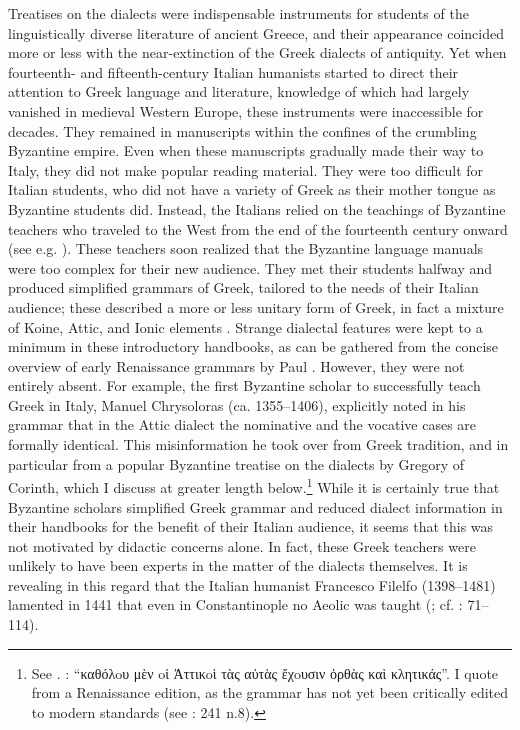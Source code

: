 Treatises on the dialects were indispensable instruments for students of the linguistically diverse literature of ancient Greece, and their appearance coincided more or less with the near-extinction of the Greek dialects of antiquity. Yet when fourteenth- and fifteenth-century Italian humanists started to direct their attention to Greek language and literature, knowledge of which had largely vanished in medieval Western Europe, these instruments were inaccessible for decades. They remained in manuscripts within the confines of the crumbling Byzantine empire. Even when these manuscripts gradually made their way to Italy, they did not make popular reading material. They were too difficult for Italian students, who did not have a variety of Greek as their mother tongue as Byzantine students did. Instead, the Italians relied on the teachings of Byzantine teachers who traveled to the West from the end of the fourteenth century onward (see e.g. \citealt{Harris1995,Botley2010,Wilson2016}). These teachers soon realized that the Byzantine language manuals were too complex for their new audience. They met their students halfway and produced simplified grammars of Greek, tailored to the needs of their Italian audience; these described a more or less unitary form of Greek, in fact a mixture of Koine, Attic, and Ionic elements \citep[123]{Ciccolella2008}. Strange dialectal features were kept to a minimum in these introductory handbooks, as can be gathered from the concise overview of early Renaissance grammars by Paul \citet{Botley2010}. However, they were not entirely absent. For example, the first Byzantine scholar to successfully teach Greek in Italy, Manuel Chrysoloras (ca. 1355–1406), explicitly noted in his grammar that in the Attic dialect the nominative and the vocative cases are formally identical. This misinformation he took over from Greek tradition, and in particular from a popular Byzantine treatise on the dialects by Gregory of Corinth, which I discuss at greater length below.\footnote{See \textcite[166 n.70]{Botley2010}. \citet[20]{Chrysoloras1512}: “καθόλoυ μὲν oἱ Ἀττικoὶ τὰς αὐτὰς ἔχoυσιν ὀρθὰς καὶ κλητικάς”. I quote from a Renaissance edition, as the grammar has not yet been critically edited to modern standards (see \citealt{Nuti2013}: 241 n.8).} While it is certainly true that Byzantine scholars simplified Greek grammar and reduced dialect information in their handbooks for the benefit of their Italian audience, it seems that this was not motivated by didactic concerns alone. In fact, these Greek teachers were unlikely to have been experts in the matter of the dialects themselves. It is revealing in this regard that the Italian humanist Francesco Filelfo (1398–1481) lamented in 1441 that even in Constantinople no Aeolic was taught (\citealt[88 n.4]{Rotolo1973}; cf. \citealt{Botley2010}: 71–114).

